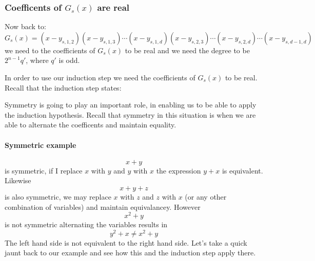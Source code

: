 \documentclass[12pt]{article}
\begin{document}
\subsubsection*{Coefficents of $G_s(x)$ are real}
Now back to:
$$ G_s(x) =(x-y_{s,1,2})(x-y_{s,1,3})\cdots(x-y_{s,1,d})(x-y_{s,2,3})\cdots (x-y_{s,2,d})\cdots (x-y_{s,d-1,d})$$
we need to the coefficients of $G_s(x)$ to be real and we need the degree to be $2^{n-1}q'$, where $q'$ is odd.
%
%
%

In order to use our induction step we need the coefficients of $G_s(x)$ to be real.  Recall that the induction step states: 
\begin{center}

\end{center}



Symmetry is going to play an important role, in enabling us to be able to apply the induction hypothesis.  Recall that symmetry in this situation is when we are able to alternate the coefficents and maintain equality.  
\paragraph*{Symmetric example}
$$ x + y $$ is symmetric, if I replace $x$ with $y$ and $y$ with $x$ the expression $y+x$ is equivalent.  Likewise $$ x+y+z$$ is also symmetric, we may replace $x$ with $z$ and $z$ with $x$ (or any other combination of variables) and maintain equivalancey.  However $$ x^2 + y$$ is not symmetric alternating the variables results in $$ y^2 + x \neq x^2 + y$$  The left hand side is not equivalent to the right hand side.  Let's take a quick jaunt back to our example and see how this and the induction step apply there.
\end{document}
